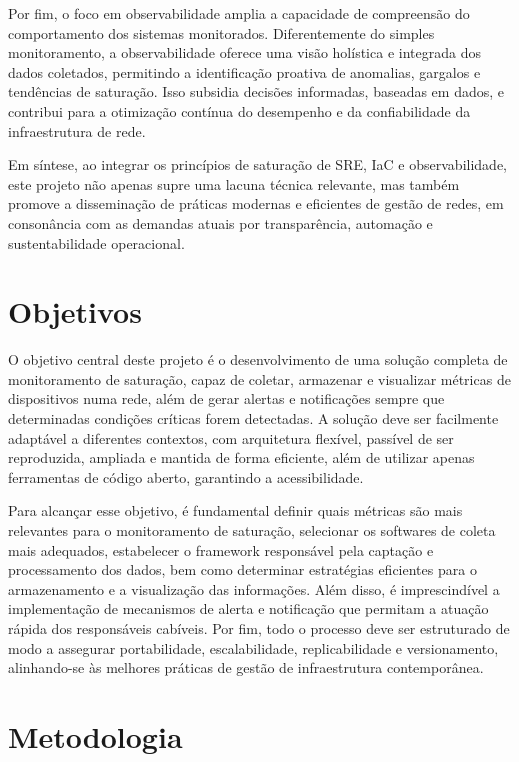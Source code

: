 Por fim, o foco em observabilidade amplia a capacidade de compreensão do comportamento dos sistemas monitorados. Diferentemente do simples monitoramento, a observabilidade oferece uma visão holística e integrada dos dados coletados, permitindo a identificação proativa de anomalias, gargalos e tendências de saturação. Isso subsidia decisões informadas, baseadas em dados, e contribui para a otimização contínua do desempenho e da confiabilidade da infraestrutura de rede.

Em síntese, ao integrar os princípios de saturação de SRE, IaC e observabilidade, este projeto não apenas supre uma lacuna técnica relevante, mas também promove a disseminação de práticas modernas e eficientes de gestão de redes, em consonância com as demandas atuais por transparência, automação e sustentabilidade operacional.

\section{Objetivos}
\label{section:Objetivos}

O objetivo central deste projeto é o desenvolvimento de uma solução completa de monitoramento de saturação, capaz de coletar, armazenar e visualizar métricas de dispositivos numa rede, além de gerar alertas e notificações sempre que determinadas condições críticas forem detectadas. A solução deve ser facilmente adaptável a diferentes contextos, com arquitetura flexível, passível de ser reproduzida, ampliada e mantida de forma eficiente, além de utilizar apenas ferramentas de código aberto, garantindo a acessibilidade.

Para alcançar esse objetivo, é fundamental definir quais métricas são mais relevantes para o monitoramento de saturação, selecionar os softwares de coleta mais adequados, estabelecer o framework responsável pela captação e processamento dos dados, bem como determinar estratégias eficientes para o armazenamento e a visualização das informações. Além disso, é imprescindível a implementação de mecanismos de alerta e notificação que permitam a atuação rápida dos responsáveis cabíveis. Por fim, todo o processo deve ser estruturado de modo a assegurar portabilidade, escalabilidade, replicabilidade e versionamento, alinhando-se às melhores práticas de gestão de infraestrutura contemporânea.

\section{Metodologia}

